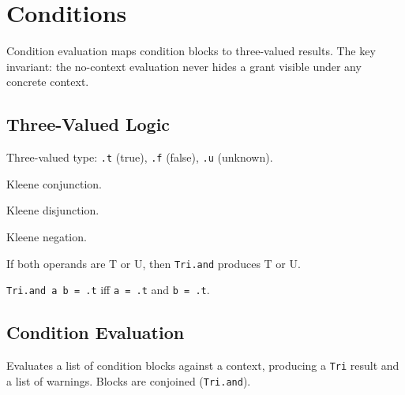 \chapter{Conditions}\label{chap:conditions}

Condition evaluation maps condition blocks to three-valued results.
The key invariant: the no-context evaluation never hides a grant
visible under any concrete context.

\section{Three-Valued Logic}

\begin{definition}[Tri]\label{def:Tri}
\leanok
Three-valued type: \texttt{.t} (true), \texttt{.f} (false),
\texttt{.u} (unknown).
\end{definition}

\begin{definition}\label{def:Tri.and}
\leanok
Kleene conjunction.
\end{definition}

\begin{definition}[Tri.or]\label{def:Tri.or}
\leanok
Kleene disjunction.
\end{definition}

\begin{definition}\label{def:Tri.not}
\leanok
Kleene negation.
\end{definition}

\begin{lemma}\label{lem:Tri.and_tu}
\leanok
If both operands are T or U, then \texttt{Tri.and} produces T or U.
\end{lemma}

\begin{lemma}\label{lem:Tri.and_eq_t}
\leanok
\texttt{Tri.and a b = .t} iff \texttt{a = .t} and \texttt{b = .t}.
\end{lemma}

\section{Condition Evaluation}

\begin{definition}[evalCond]\label{def:evalCond}
\leanok
Evaluates a list of condition blocks against a context, producing
a \texttt{Tri} result and a list of warnings.  Blocks are conjoined
(\texttt{Tri.and}).
\end{definition}

